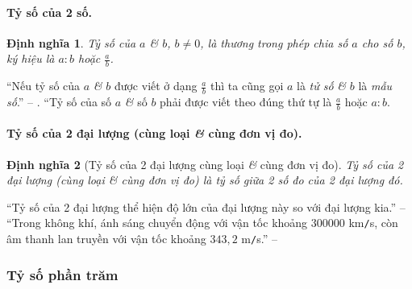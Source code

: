 \documentclass{article}
\numberwithin{equation}{section}
\newtheorem{dinhnghia}{Định nghĩa}[section]
\begin{document}
\paragraph{Tỷ số của 2 số.}
\begin{dinhnghia}
	 \emph{Tỷ số} của $a$ \textit{\&} $b$, $b\ne 0$, là thương trong phép chia số $a$ cho số $b$, ký hiệu là $a:b$ hoặc $\frac{a}{b}$.
\end{dinhnghia}
``Nếu tỷ số của $a$ \textit{\&} $b$ được viết ở dạng $\frac{a}{b}$ thì ta cũng gọi $a$ là \textit{tử số} \textit{\&} $b$ là \textit{mẫu số}.'' -- \cite[p. 61]{SGK_Toan_6_Canh_Dieu_tap_2}. ``Tỷ số của số $a$ \textit{\&} số $b$ phải được viết theo đúng thứ tự là $\frac{a}{b}$ hoặc $a:b$.

\paragraph{Tỷ số của 2 đại lượng (cùng loại \textit{\&} cùng đơn vị đo).}
\begin{dinhnghia}[Tỷ số của 2 đại lượng cùng loại \textit{\&} cùng đơn vị đo]
	\emph{Tỷ số của 2 đại lượng (cùng loại \textit{\&} cùng đơn vị đo)} là tỷ số giữa 2 số đo của 2 đại lượng đó.
\end{dinhnghia}
``Tỷ số của 2 đại lượng thể hiện độ lớn của đại lượng này so với đại lượng kia.'' -- \cite[p. 62]{SGK_Toan_6_Canh_Dieu_tap_2} ``Trong không khí, ánh sáng chuyển động với vận tốc khoảng $300 000$ km\texttt{/}s, còn âm thanh lan truyền với vận tốc khoảng $343,2$ m\texttt{/}s.'' -- \cite[p. 63]{SGK_Toan_6_Canh_Dieu_tap_2}

\subsubsection{Tỷ số phần trăm}
\end{document}
